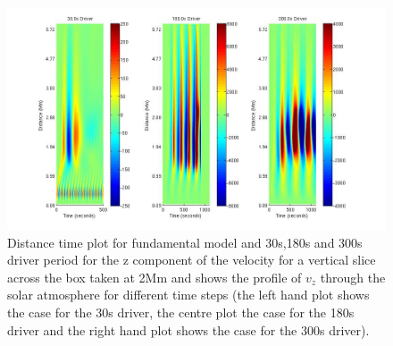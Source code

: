 \documentclass[authoryear,final,1p]{elsarticle}
\begin{document}




\begin{figure}[h]\label{fig6_dt_30_180_300_0_vert_2Mm}
\includegraphics[scale=0.4]{images/fig4_dt_30_180_300_0_vert_2Mm.jpg}
\caption{Distance time plot for fundamental model and 30s,180s and 300s driver period for the z component of the velocity for a vertical slice across the box  taken at 2Mm and shows  the profile of $v_{z}$ through the solar atmosphere for different time steps (the left hand plot shows the case for the 30s driver, the centre plot the case for the 180s driver and the right hand plot shows the case for the 300s driver). }
\end{figure}
\end{document}
